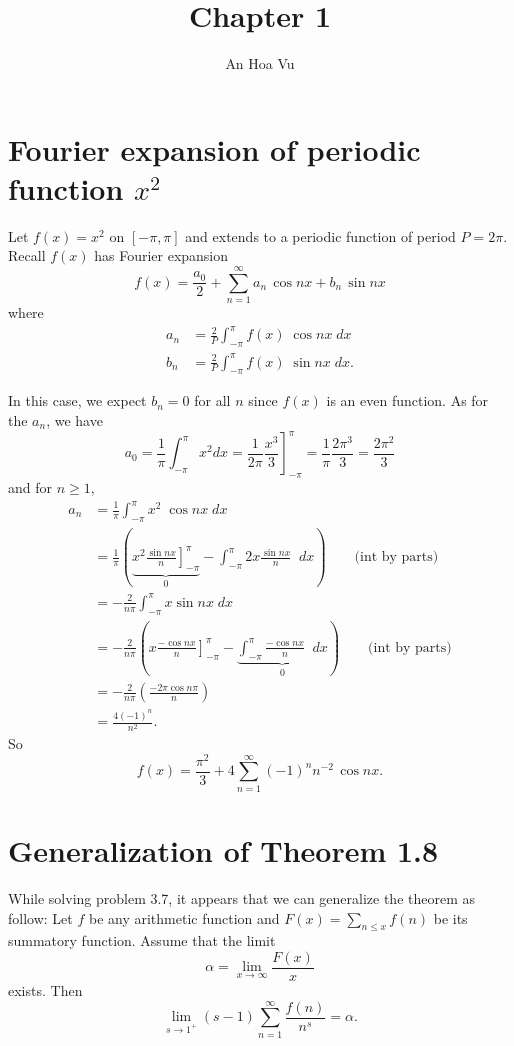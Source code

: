 \documentclass{article}
\title{Chapter 1}
\author{An Hoa Vu}
\begin{document}
\maketitle
\fi

\section{Fourier expansion of periodic function $x^2$}

Let $f(x) = x^2$ on $[-\pi, \pi]$ and extends to a periodic function of period $P = 2\pi$. Recall $f(x)$ has Fourier expansion
$$f(x) = \frac{a_0}{2} + \sum_{n = 1}^{\infty} a_n \, \cos nx + b_n \, \sin nx$$
where
\begin{align*}
a_n &= \frac{2}{P} \int_{-\pi}^{\pi} f(x) \; \cos nx \; dx\\
b_n &= \frac{2}{P} \int_{-\pi}^{\pi} f(x) \; \sin nx \; dx.
\end{align*}

In this case, we expect $b_n = 0$ for all $n$ since $f(x)$ is an even function. As for the $a_n$, we have
$$a_0 = \frac{1}{\pi} \int_{-\pi}^{\pi} x^2 dx = \frac{1}{2\pi} \left. \frac{x^3}{3} \right]_{-\pi}^{\pi} = \frac{1}{\pi} \frac{2\pi^3}{3} = \frac{2\pi^2}{3}$$
and for $n \geq 1$,
\begin{align*}
a_n &= \frac{1}{\pi} \int_{-\pi}^{\pi} x^2 \; \cos nx \; dx\\
&= \frac{1}{\pi} \left( \underbrace{\left. x^2 \frac{\sin nx}{n} \right]_{-\pi}^{\pi}}_{0} - \int_{-\pi}^{\pi} 2x  \frac{\sin nx}{n} \;  \; dx \right) \qquad \text{(int by parts)}\\
&= -\frac{2}{n \pi} \int_{-\pi}^{\pi} x  \sin nx \; dx\\
&=  -\frac{2}{n \pi} \left( \left. x \frac{-\cos nx}{n} \right]_{-\pi}^{\pi} - \underbrace{\int_{-\pi}^{\pi} \frac{-\cos nx}{n} \;  \; dx}_{0} \right) \qquad \text{(int by parts)}\\
&= -\frac{2}{n \pi} \left( \frac{- 2 \pi \cos n\pi}{n} \right)\\
&= \frac{4 (-1)^n}{n^2}.
\end{align*}
So
$$f(x) = \frac{\pi^2}{3} + 4 \sum_{n = 1}^{\infty} (-1)^n n^{-2} \, \cos nx.$$

\section{Generalization of Theorem 1.8}

While solving problem 3.7, it appears that we can generalize the theorem as follow: Let $f$ be any arithmetic function and $F(x) = \sum_{n \leq x} f(n)$ be its summatory function. Assume that the limit
$$\alpha = \lim_{x \rightarrow \infty} \frac{F(x)}{x}$$
exists. Then
$$\lim_{s \rightarrow 1^+} (s - 1) \sum_{n = 1}^{\infty} \frac{f(n)}{n^s} = \alpha.$$
\end{document}
